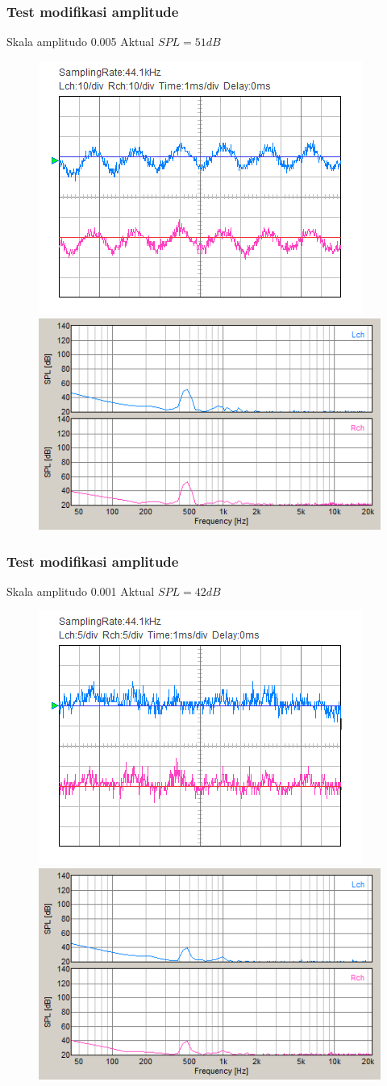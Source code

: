 \documentclass[table,dvipsnames,10pt]{beamer}
\begin{document}
	\begin{frame}[fragile]
	\frametitle{Test modifikasi amplitude}
	\begin{exampleblock}{Skala amplitudo 0.005}
		Aktual $SPL = 51 dB$
		\begin{figure}[H]
			\centering
			\includegraphics[width=0.4\linewidth]{result/day_4/500Hz/tone0005}
			\includegraphics[width=0.45\linewidth]{result/day_4/500Hz/fft_tone0005}
		\end{figure}
	\end{exampleblock}
	\end{frame}

	\begin{frame}[fragile]
	\frametitle{Test modifikasi amplitude}
	\begin{exampleblock}{Skala amplitudo 0.001}
		Aktual $SPL = 42 dB$
		\begin{figure}[H]
			\centering
			\includegraphics[width=0.4\linewidth]{result/day_4/500Hz/tone0001}
			\includegraphics[width=0.45\linewidth]{result/day_4/500Hz/fft_tone0001}
		\end{figure}
	\end{exampleblock}
	\end{frame}
\end{document}

